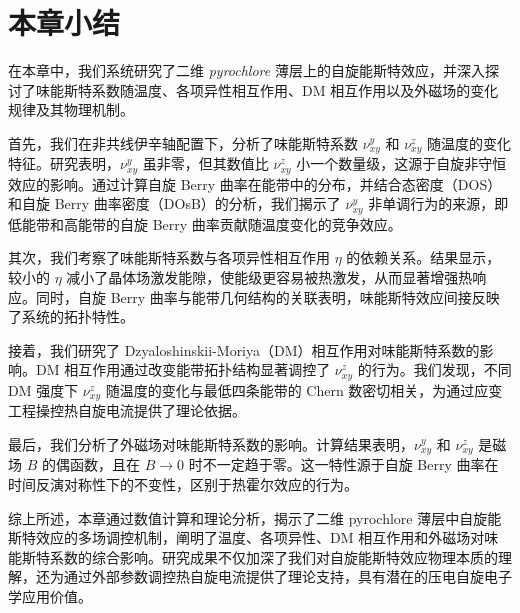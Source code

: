     \section{本章小结}

    在本章中，我们系统研究了二维 \textit{pyrochlore} 薄层上的自旋能斯特效应，并深入探讨了味能斯特系数随温度、各项异性相互作用、DM 相互作用以及外磁场的变化规律及其物理机制。

    首先，我们在非共线伊辛轴配置下，分析了味能斯特系数 $\nu^y_{xy}$ 和 $\nu^z_{xy}$ 随温度的变化特征。研究表明，$\nu^y_{xy}$ 虽非零，但其数值比 $\nu^z_{xy}$ 小一个数量级，这源于自旋非守恒效应的影响。通过计算自旋 Berry 曲率在能带中的分布，并结合态密度（DOS）和自旋 Berry 曲率密度（DOsB）的分析，我们揭示了 $\nu^y_{xy}$ 非单调行为的来源，即低能带和高能带的自旋 Berry 曲率贡献随温度变化的竞争效应。

    其次，我们考察了味能斯特系数与各项异性相互作用 $\eta$ 的依赖关系。结果显示，较小的 $\eta$ 减小了晶体场激发能隙，使能级更容易被热激发，从而显著增强热响应。同时，自旋 Berry 曲率与能带几何结构的关联表明，味能斯特效应间接反映了系统的拓扑特性。

    接着，我们研究了 Dzyaloshinskii-Moriya（DM）相互作用对味能斯特系数的影响。DM 相互作用通过改变能带拓扑结构显著调控了 $\nu^z_{xy}$ 的行为。我们发现，不同 DM 强度下 $\nu^z_{xy}$ 随温度的变化与最低四条能带的 Chern 数密切相关，为通过应变工程操控热自旋电流提供了理论依据。

    最后，我们分析了外磁场对味能斯特系数的影响。计算结果表明，$\nu^y_{xy}$ 和 $\nu^z_{xy}$ 是磁场 $B$ 的偶函数，且在 $B \to 0$ 时不一定趋于零。这一特性源于自旋 Berry 曲率在时间反演对称性下的不变性，区别于热霍尔效应的行为。

    综上所述，本章通过数值计算和理论分析，揭示了二维 pyrochlore 薄层中自旋能斯特效应的多场调控机制，阐明了温度、各项异性、DM 相互作用和外磁场对味能斯特系数的综合影响。研究成果不仅加深了我们对自旋能斯特效应物理本质的理解，还为通过外部参数调控热自旋电流提供了理论支持，具有潜在的压电自旋电子学应用价值。